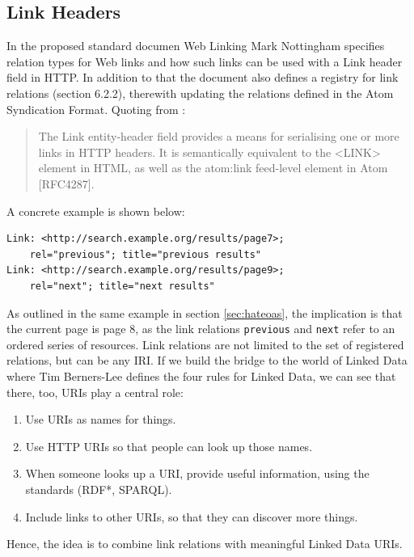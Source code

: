 \documentclass{acm_proc_article-sp}
\begin{document}
\subsection{Link Headers}\label{sec:linkheaders}
In the proposed standard documen Web Linking\cite{Link:Headers} Mark Nottingham specifies relation types for Web links and how such links can be used with a Link header field in HTTP. In addition to that the document also defines a registry for link relations (section 6.2.2), therewith updating the relations defined in the Atom Syndication Format. Quoting from \cite{Link:Headers}:
\begin{quote}
The Link entity-header field provides a means for serialising one or more links in HTTP headers.  It is semantically equivalent to the <LINK> element in HTML, as well as the atom:link feed-level element in Atom [RFC4287].
\end{quote}
A concrete example is shown below:
\begin{verbatim}
Link: <http://search.example.org/results/page7>;
    rel="previous"; title="previous results"
Link: <http://search.example.org/results/page9>;
    rel="next"; title="next results"
\end{verbatim}
As outlined in the same example in section \ref{sec:hateoas}, the implication is that the current page is page 8, as the link relations \texttt{previous} and \texttt{next} refer to an ordered series of resources. Link relations are not limited to the set of registered relations, but can be any IRI. If we build the bridge to the world of Linked Data\cite{TimBL:LinkedData} where Tim Berners-Lee defines the four rules for Linked Data, we can see that there, too, URIs play a central role:
\begin{enumerate}
\item Use URIs as names for things.
\item Use HTTP URIs so that people can look up those names.
\item When someone looks up a URI, provide useful information, using the standards (RDF*, SPARQL).
\item Include links to other URIs, so that they can discover more things.
\end{enumerate}
Hence, the idea is to combine link relations with meaningful Linked Data URIs.
\end{document}
